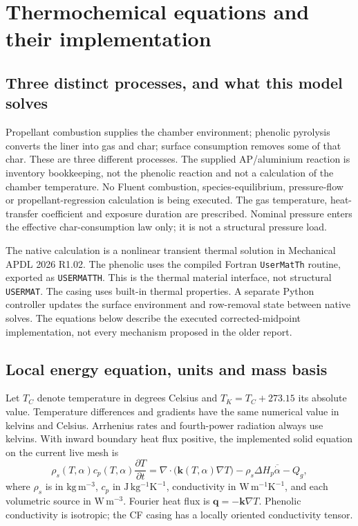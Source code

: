 \section{Thermochemical equations and their implementation}
\label{sec:physics-detail}
\subsection{Three distinct processes, and what this model solves}
Propellant combustion supplies the chamber environment; phenolic pyrolysis converts the liner into gas and char; surface consumption removes some of that char. These are three different processes. The supplied AP/aluminium reaction is inventory bookkeeping, not the phenolic reaction and not a calculation of the chamber temperature. No Fluent combustion, species-equilibrium, pressure-flow or propellant-regression calculation is being executed. The gas temperature, heat-transfer coefficient and exposure duration are prescribed. Nominal pressure enters the effective char-consumption law only; it is not a structural pressure load.

The native calculation is a nonlinear transient thermal solution in Mechanical APDL 2026 R1.02. The phenolic uses the compiled Fortran \texttt{UserMatTh} routine, exported as \texttt{USERMATTH}. This is the thermal material interface, not structural \texttt{USERMAT}. The casing uses built-in thermal properties. A separate Python controller updates the surface environment and row-removal state between native solves. The equations below describe the executed corrected-midpoint implementation, not every mechanism proposed in the older report.

\subsection{Local energy equation, units and mass basis}
Let $T_C$ denote temperature in degrees Celsius and $T_K=T_C+273.15$ its absolute value. Temperature differences and gradients have the same numerical value in kelvins and Celsius. Arrhenius rates and fourth-power radiation always use kelvins. With inward boundary heat flux positive, the implemented solid equation on the current live mesh is
\begin{equation}\label{eq:implemented-energy}
 \rho_s(T,\alpha)c_p(T,\alpha)\frac{\partial T}{\partial t}
 =\nabla\!\cdot\!\bigl(\boldsymbol{k}(T,\alpha)\nabla T\bigr)
 -\rho_s\Delta H_p\overline{\dot\alpha}-Q_g,
\end{equation}
where $\rho_s$ is in $\mathrm{kg\,m^{-3}}$, $c_p$ in $\mathrm{J\,kg^{-1}K^{-1}}$, conductivity in $\mathrm{W\,m^{-1}K^{-1}}$, and each volumetric source in $\mathrm{W\,m^{-3}}$. Fourier heat flux is $\boldsymbol q=-\boldsymbol k\nabla T$. Phenolic conductivity is isotropic; the CF casing has a locally oriented conductivity tensor.

